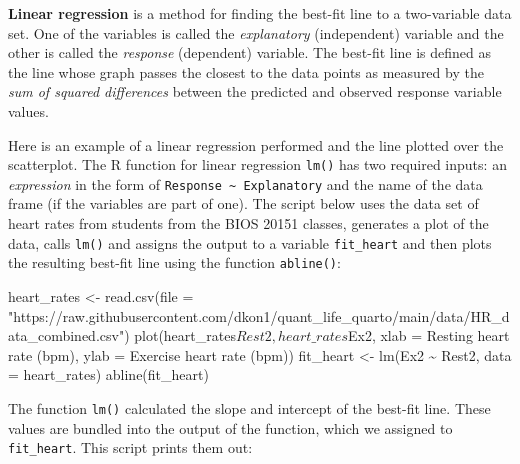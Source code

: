 \documentclass[
  letterpaper,
  DIV=11,
  numbers=noendperiod]{scrreprt}
\newenvironment{Shaded}{\begin{snugshade}}{\end{snugshade}}
\newcommand{\NormalTok}[1]{\textcolor[rgb]{0.00,0.23,0.31}{#1}}
\begin{document}
\begin{tcolorbox}[enhanced jigsaw, arc=.35mm, colframe=quarto-callout-tip-color-frame, left=2mm, opacitybacktitle=0.6, breakable, title=\textcolor{quarto-callout-tip-color}{\faLightbulb}\hspace{0.5em}{Linear regression}, toprule=.15mm, coltitle=black, bottomtitle=1mm, toptitle=1mm, colback=white, leftrule=.75mm, colbacktitle=quarto-callout-tip-color!10!white, titlerule=0mm, opacityback=0, rightrule=.15mm, bottomrule=.15mm]

\textbf{Linear regression} is a method for finding the best-fit line to
a two-variable data set. One of the variables is called the
\emph{explanatory} (independent) variable and the other is called the
\emph{response} (dependent) variable. The best-fit line is defined as
the line whose graph passes the closest to the data points as measured
by the \emph{sum of squared differences} between the predicted and
observed response variable values.

\end{tcolorbox}

Here is an example of a linear regression performed and the line plotted
over the scatterplot. The R function for linear regression \texttt{lm()}
has two required inputs: an \emph{expression} in the form of
\texttt{Response\ \textasciitilde{}\ Explanatory} and the name of the
data frame (if the variables are part of one). The script below uses the
data set of heart rates from students from the BIOS 20151 classes,
generates a plot of the data, calls \texttt{lm()} and assigns the output
to a variable \texttt{fit\_heart} and then plots the resulting best-fit
line using the function \texttt{abline()}:

\begin{Shaded}
\begin{Highlighting}[]
\NormalTok{heart\_rates \textless{}{-} read.csv(file = "https://raw.githubusercontent.com/dkon1/quant\_life\_quarto/main/data/HR\_data\_combined.csv")}
\NormalTok{plot(heart\_rates$Rest2, heart\_rates$Ex2, xlab = \textquotesingle{}Resting heart rate (bpm)\textquotesingle{}, ylab = \textquotesingle{}Exercise heart rate (bpm)\textquotesingle{})}
\NormalTok{fit\_heart \textless{}{-} lm(Ex2 \textasciitilde{} Rest2, data = heart\_rates)}
\NormalTok{abline(fit\_heart)}
\end{Highlighting}
\end{Shaded}

The function \texttt{lm()} calculated the slope and intercept of the
best-fit line. These values are bundled into the output of the function,
which we assigned to \texttt{fit\_heart}. This script prints them out:
\end{document}
